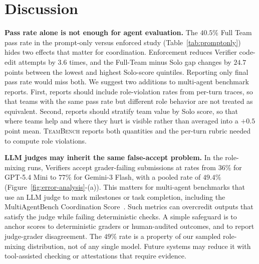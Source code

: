 \documentclass{article}
\begin{document}
\section{Discussion}
\label{sec:discussion}

\textbf{Pass rate alone is not enough for agent evaluation.} The $40.5\%$ Full Team pass rate in the prompt-only versus enforced study
(Table~\ref{tab:promptonly}) hides two effects that matter for coordination. Enforcement reduces Verifier code-edit attempts by 3.6 times, and the Full-Team minus Solo gap changes by $24.7$ points between the lowest and highest Solo-score quintiles. Reporting only final pass rate would miss both. We suggest two additions to multi-agent benchmark reports. First, reports should include role-violation rates from per-turn traces, so that teams with the same pass rate but different role behavior are not treated as equivalent. Second, reports should stratify team value by Solo score, so that where teams help and where they hurt is visible rather than averaged into a $+0.5$ point
mean. \textsc{TeamBench} reports both quantities and the per-turn rubric needed to compute role violations.

\textbf{LLM judges may inherit the same false-accept problem.} In the role-mixing runs, Verifiers accept grader-failing submissions at rates from
$36\%$ for GPT-5.4 Mini to $77\%$ for Gemini-3 Flash, with a pooled rate of $49.4\%$ (Figure~\ref{fig:error-analysis}-(a)). This matters for multi-agent benchmarks that use an LLM judge to mark milestones or task completion, including
the MultiAgentBench Coordination Score~\citep{zhu2025multiagentbench}. Such
metrics can overcredit outputs that satisfy the judge while failing deterministic checks. A simple safeguard is to anchor scores to deterministic graders or human-audited outcomes, and to report judge-grader disagreement. The $49\%$
rate is a property of our sampled role-mixing distribution, not of any single model. Future systems may reduce it with tool-assisted checking or attestations that require evidence.
\end{document}
